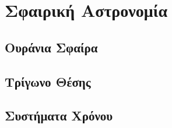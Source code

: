 \chapter{Σφαιρική Αστρονομία}
\label{ch:Chapter1}



\section{Ουράνια Σφαίρα}
\label{sec:SectionName1}



\section{Τρίγωνο Θέσης}
\label{sec:SectionName2}






\section{Συστήματα Χρόνου}
\label{sec:SectionName3}

